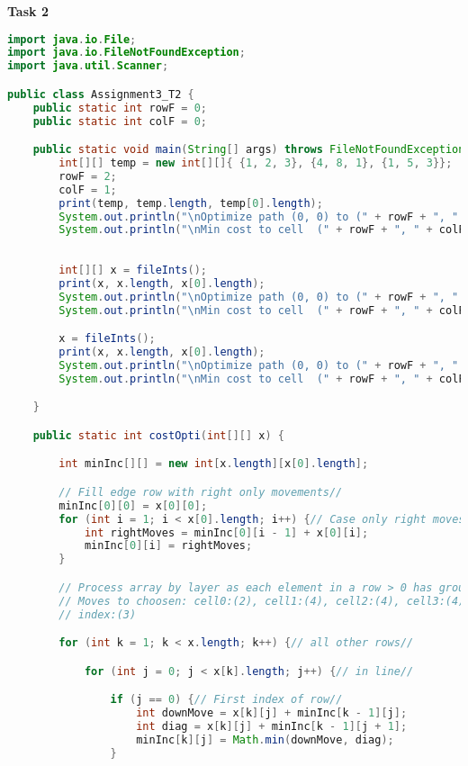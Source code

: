 \documentclass[11pt]{article}
\begin{document}
\pagebreak
\textbf{Task 2}
\begin{lstlisting}[language=Java]
import java.io.File;
import java.io.FileNotFoundException;
import java.util.Scanner;

public class Assignment3_T2 {
    public static int rowF = 0;
    public static int colF = 0;

    public static void main(String[] args) throws FileNotFoundException {
        int[][] temp = new int[][]{ {1, 2, 3}, {4, 8, 1}, {1, 5, 3}};
        rowF = 2;
        colF = 1;
        print(temp, temp.length, temp[0].length);
        System.out.println("\nOptimize path (0, 0) to (" + rowF + ", " + colF + ")\n");
        System.out.println("\nMin cost to cell  (" + rowF + ", " + colF + ") : " + costOpti(temp)+"\n");
        
        
        int[][] x = fileInts();
        print(x, x.length, x[0].length);
        System.out.println("\nOptimize path (0, 0) to (" + rowF + ", " + colF + ")\n");
        System.out.println("\nMin cost to cell  (" + rowF + ", " + colF + ") : " + costOpti(x)+"\n");

        x = fileInts();
        print(x, x.length, x[0].length);
        System.out.println("\nOptimize path (0, 0) to (" + rowF + ", " + colF + ")\n");
        System.out.println("\nMin cost to cell  (" + rowF + ", " + colF + ") : " + costOpti(x)+"\n");

    }

    public static int costOpti(int[][] x) {

        int minInc[][] = new int[x.length][x[0].length];

        // Fill edge row with right only movements//
        minInc[0][0] = x[0][0];
        for (int i = 1; i < x[0].length; i++) {// Case only right moves: Top//
            int rightMoves = minInc[0][i - 1] + x[0][i];
            minInc[0][i] = rightMoves;
        }

        // Process array by layer as each element in a row > 0 has group of
        // Moves to choosen: cell0:(2), cell1:(4), cell2:(4), cell3:(4), ..., Last
        // index:(3)

        for (int k = 1; k < x.length; k++) {// all other rows//

            for (int j = 0; j < x[k].length; j++) {// in line//

                if (j == 0) {// First index of row//
                    int downMove = x[k][j] + minInc[k - 1][j];
                    int diag = x[k][j] + minInc[k - 1][j + 1];
                    minInc[k][j] = Math.min(downMove, diag);
                }


\end{lstlisting}
\end{document}
